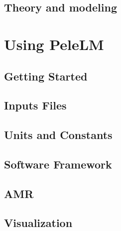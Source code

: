 \documentclass[11pt]{book}
\newcommand{\pelelm}{{\sf PeleLM}}
\begin{document}
\chapter{Theory and modeling}


\part{Using \pelelm}

\chapter{Getting Started}


\chapter{Inputs Files}


\chapter{Units and Constants}


\chapter{Software Framework}



\chapter{AMR}


\chapter{Visualization}


\backmatter

\renewcommand\bibname{References}


\end{document}

